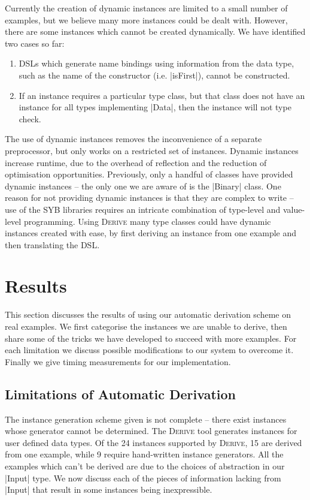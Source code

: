 \documentclass[preprint,draft]{sigplanconf}
\newcommand{\derive}{\textsc{Derive}}
\begin{document}
Currently the creation of dynamic instances are limited to a small number of examples, but we believe many more instances could be dealt with. However, there are some instances which cannot be created dynamically. We have identified two cases so far:

\begin{enumerate}
\item DSLs which generate name bindings using information from the data type, such as the name of the constructor (i.e. |isFirst|), cannot be constructed.
\item If an instance requires a particular type class, but that class does not have an instance for all types implementing |Data|, then the instance will not type check.
\end{enumerate}

The use of dynamic instances removes the inconvenience of a separate preprocessor, but only works on a restricted set of instances. Dynamic instances increase runtime, due to the overhead of reflection and the reduction of optimisation opportunities. Previously, only a handful of classes have provided dynamic instances -- the only one we are aware of is the |Binary| class. One reason for not providing dynamic instances is that they are complex to write -- use of the SYB libraries requires an intricate combination of type-level and value-level programming. Using \derive{} many type classes could have dynamic instances created with ease, by first deriving an instance from one example and then translating the DSL.

\section{Results}
\label{sec:results}

This section discusses the results of using our automatic derivation scheme on real examples. We first categorise the instances we are unable to derive, then share some of the tricks we have developed to succeed with more examples. For each limitation we discuss possible modifications to our system to overcome it. Finally we give timing measurements for our implementation.

\subsection{Limitations of Automatic Derivation}
\label{sec:failure}

The instance generation scheme given is not complete -- there exist instances whose generator cannot be determined. The \derive{} tool \cite{derive} generates instances for user defined data types. Of the 24 instances supported by \derive{}, 15 are derived from one example, while 9 require hand-written instance generators. All the examples which can't be derived are due to the choices of abstraction in our |Input| type. We now discuss each of the pieces of information lacking from |Input| that result in some instances being inexpressible.
\end{document}
